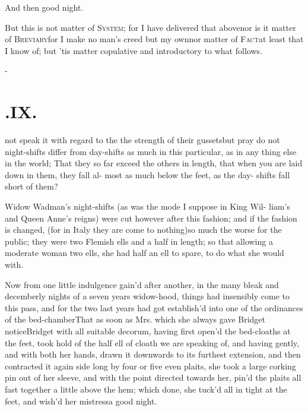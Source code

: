 \documentclass{article}
\begin{document}
\tsk And then good night.

But this is not matter of \textsc{System}; for I have
delivered that above\tsh nor is it matter of
\textsc{Breviary}\tsh for I make no man’s
creed but my own\tsh nor matter of
\textsc{Fact}\tsh at least that I know of;\break
but ’tis matter copulative and introductory to what follows.

\vfill{}\eject
\null\kern-\baselineskip
\section{.\enspace IX.}

 not speak it with regard to the\break
{}\break 
the strength of their gussets\tsh but pray\break
do not night-shifts differ from day-shifts\break
as much in this particular, as in any\break
thing else in the world; That they so far\break
exceed the others in length, that when\break
you are laid down in them, they fall al-\break
most as much below the feet, as the day-\break
shifts fall short of them?

Widow Wadman’s night-shifts (as\break
was the mode I suppose in King Wil-\break
liam’s and Queen Anne’s reigns) were\break
cut however after this fashion; and if the\break
fashion is changed, (for in Italy they are\break
come to nothing)\tsh so much the worse
for the public; they were two Flemish ells
and a half in length; so that allow\-ing a moderate woman two ells,
she had half an ell to spare, to do what she would with.

Now from one little indulgence gain’d after another, in the many
bleak and decemberly nights of a seven years widow-hood, things
had insensibly come to this pass, and for the two last years had
got establish’d into one of the ordinances of the
bed-chamber\tsk That as soon as Mrs.\@ 
{}
which she always gave Bridget notice\tsk Bridget with all
suitable decorum, having first open’d the bed-cloaths at the
feet, took hold of the half ell of cloath we are speaking of,
and having gently, and with both her hands, drawn it
downwards to its furthest extension, and then contracted it
again side long by four or five even plaits, she took a large
corking pin out of her sleeve, and with the point directed
towards her, pin’d the plaits all fast together a little above
the hem; which done, she tuck’d all in tight at the feet, and
wish’d her mistress\break a good night.
\end{document}
